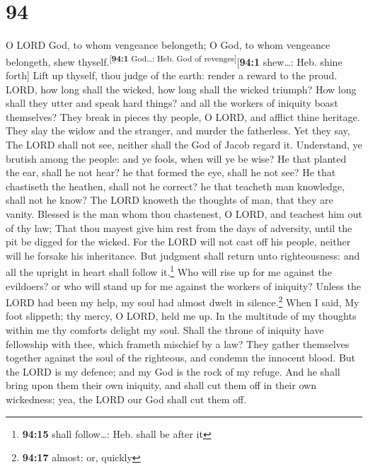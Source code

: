 \hypertarget{section-93}{%
\section{94}\label{section-93}}

 O LORD God, to whom vengeance belongeth; O God, to whom
vengeance belongeth, shew thyself.\textsuperscript{{[}\textbf{94:1}
God\ldots: Heb. God of revenges{]}}{[}\textbf{94:1} shew\ldots: Heb.
shine forth{]}  Lift up thyself, thou judge of the earth:
render a reward to the proud.  LORD, how long shall the
wicked, how long shall the wicked triumph?  How long shall
they utter and speak hard things? and all the workers of iniquity boast
themselves?  They break in pieces thy people, O LORD, and
afflict thine heritage.  They slay the widow and the
stranger, and murder the fatherless.  Yet they say, The
LORD shall not see, neither shall the God of Jacob regard it.
 Understand, ye brutish among the people: and ye fools,
when will ye be wise?  He that planted the ear, shall he
not hear? he that formed the eye, shall he not see?  He
that chastiseth the heathen, shall not he correct? he that teacheth man
knowledge, shall not he know?  The LORD knoweth the
thoughts of man, that they are vanity.  Blessed is the
man whom thou chastenest, O LORD, and teachest him out of thy law;
 That thou mayest give him rest from the days of
adversity, until the pit be digged for the wicked.  For
the LORD will not cast off his people, neither will he forsake his
inheritance.  But judgment shall return unto
righteousness: and all the upright in heart shall follow it.\footnote{\textbf{94:15}
  shall follow\ldots: Heb. shall be after it}  Who will
rise up for me against the evildoers? or who will stand up for me
against the workers of iniquity?  Unless the LORD had
been my help, my soul had almost dwelt in silence.\footnote{\textbf{94:17}
  almost: or, quickly}  When I said, My foot slippeth;
thy mercy, O LORD, held me up.  In the multitude of my
thoughts within me thy comforts delight my soul.  Shall
the throne of iniquity have fellowship with thee, which frameth mischief
by a law?  They gather themselves together against the
soul of the righteous, and condemn the innocent blood. 
But the LORD is my defence; and my God is the rock of my refuge.
 And he shall bring upon them their own iniquity, and
shall cut them off in their own wickedness; yea, the LORD our God shall
cut them off.

